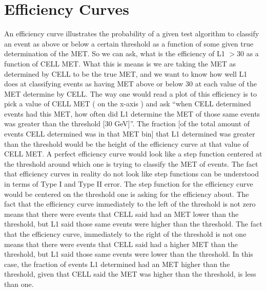 \section{Efficiency Curves}
An efficiency curve illustrates the probability of a given test algorithm to classify an event as above or below a certain threshold as a function of some given true determination of the MET. 
So we can ask, what is the efficiency of L1 $> 30$ as a function of CELL MET. What this is means is we are taking the MET as determined by CELL to be the true MET, and we want to know how well L1 does at classifying events as having MET above or below $30$ at each value of the MET determine by CELL. 
The way one would read a plot of this efficiency is to pick a value of CELL MET ( on the x-axis ) and ask ``when CELL determined events had this MET, how often did L1 determine the MET of those same events was greater than the threshold [30 GeV]''. 
The fraction [of the total amount of events CELL determined was in that MET bin] that L1 determined was greater than the threshold would be the height of the efficiency curve at that value of CELL MET.
A perfect efficiency curve would look like a step function centered at the threshold around which one is trying to classify the MET of events. 
The fact that efficiency curves in reality do not look like step functions can be understood in terms of Type I and Type II error. 
The step function for the efficiency curve would be centered on the threshold one is asking for the efficiency about. 
The fact that the efficiency curve immediately to the left of the threshold is not zero means that there were events that CELL said had an MET lower than the threshold, but L1 said those same events were higher than the threshold. 
The fact that the efficiency curve, immediately to the right of the threshold is not one means that there were events that CELL said had a higher MET than the threshold, but L1 said those same events were lower than the threshold. 
In this case, the fraction of events L1 determined had an MET higher than the threshold, given that CELL said the MET was higher than the threshold, is less than one.
